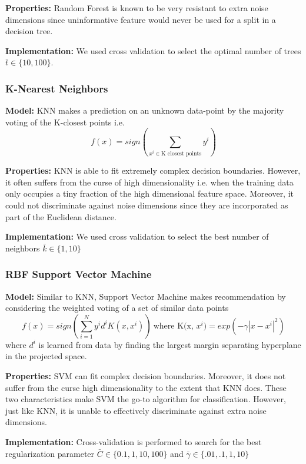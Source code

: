 \documentclass{article}
\begin{document}
\textbf{Properties:}
Random Forest is known to be very resistant to extra noise dimensions since uninformative feature would never be used for a split in a decision tree.

\textbf{Implementation:}
We used cross validation to select the optimal number of trees $\bar{t} \in \{10, 100\}$.

\subsubsection*{K-Nearest Neighbors}
\textbf{Model:}
KNN makes a prediction on an unknown data-point by the majority voting of the K-closest points i.e. $$f(x) = sign(\sum_{x^i \in \text{K closest points}} y^i) $$

\textbf{Properties:}
KNN is able to fit extremely complex decision boundaries. However, it often suffers from the curse of high dimensionality i.e. when the training data only occupies a tiny fraction of the high dimensional feature space. Moreover, it could not discriminate against noise dimensions since they are incorporated as part of the Euclidean distance.

\textbf{Implementation:}
We used cross validation to select the best number of neighbors $\bar{k} \in \{1, 10\}$




\subsubsection*{RBF Support Vector Machine}
\textbf{Model:}
Similar to KNN, Support Vector Machine makes recommendation by considering the weighted voting of a set of similar data points
$$f(x) = sign(\sum_{i=1}^{N} y^i d^i K(x, x^i))\ \text{where K(x, $x^i$)} = exp(-\gamma|x - x^i|^2)$$
where $d^i$ is learned from data by finding the largest margin separating hyperplane in the projected space.

\textbf{Properties:}
SVM can fit complex decision boundaries. Moreover, it does not suffer from the curse high dimensionality to the extent that KNN does. These two characteristics make SVM the go-to algorithm for classification. However, just like KNN, it is unable to effectively discriminate against extra noise dimensions.

\textbf{Implementation:}
Cross-validation is performed to search for the best regularization parameter $\bar{C} \in \{0.1, 1, 10, 100\}$ and $\bar{\gamma} \in \{.01, .1, 1, 10\}$
\end{document}
